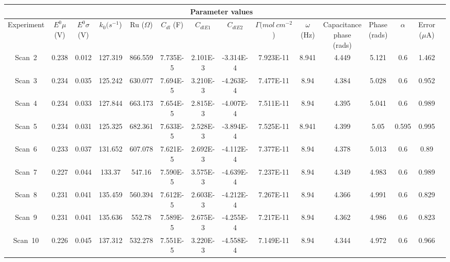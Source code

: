 \documentclass[preview]{standalone}
\begin{document}
\begin{center}
\begin{tabular}{|c|c|c|c|c|c|c|c|c|c|c|c|c|c|c|}
\hline
\multicolumn{14}{|c|}{Parameter values}\\ 
\hline
Experiment & $E^0 \mu$ (V) & $E^0 \sigma$ (V) & $k_0 (s^{-1}$) & Ru ($\Omega$) & $C_{dl}$ (F) & $C_{dlE1}$ & $C_{dlE2}$ & $\Gamma (mol\:cm^{-2}$) & $\omega$ (Hz) & Capacitance phase (rads) & Phase (rads) & $\alpha$ & Error ($\mu$A)\\
\hline
Scan\ 2 & 0.238 & 0.012 & 127.319 & 866.559 & 7.735E-5 & 2.101E-3 & -3.314E-4 & 7.923E-11 & 8.941 & 4.449 & 5.121 & 0.6 & 1.462\\
\hline
Scan\ 3 & 0.234 & 0.035 & 125.242 & 630.077 & 7.694E-5 & 3.210E-3 & -4.263E-4 & 7.477E-11 & 8.94 & 4.384 & 5.028 & 0.6 & 0.952\\
\hline
Scan\ 4 & 0.234 & 0.033 & 127.844 & 663.173 & 7.654E-5 & 2.815E-3 & -4.007E-4 & 7.511E-11 & 8.94 & 4.395 & 5.041 & 0.6 & 0.989\\
\hline
Scan\ 5 & 0.234 & 0.031 & 125.325 & 682.361 & 7.633E-5 & 2.528E-3 & -3.894E-4 & 7.525E-11 & 8.941 & 4.399 & 5.05 & 0.595 & 0.995\\
\hline
Scan\ 6 & 0.233 & 0.037 & 131.652 & 607.078 & 7.621E-5 & 2.692E-3 & -4.112E-4 & 7.377E-11 & 8.94 & 4.378 & 5.013 & 0.6 & 0.89\\
\hline
Scan\ 7 & 0.227 & 0.044 & 133.37 & 547.16 & 7.590E-5 & 3.575E-3 & -4.639E-4 & 7.237E-11 & 8.94 & 4.349 & 4.983 & 0.6 & 0.989\\
\hline
Scan\ 8 & 0.231 & 0.041 & 135.459 & 560.394 & 7.612E-5 & 2.603E-3 & -4.212E-4 & 7.267E-11 & 8.94 & 4.366 & 4.991 & 0.6 & 0.829\\
\hline
Scan\ 9 & 0.231 & 0.041 & 135.636 & 552.78 & 7.589E-5 & 2.675E-3 & -4.255E-4 & 7.217E-11 & 8.94 & 4.362 & 4.986 & 0.6 & 0.823\\
\hline
Scan\ 10 & 0.226 & 0.045 & 137.312 & 532.278 & 7.551E-5 & 3.220E-3 & -4.558E-4 & 7.149E-11 & 8.94 & 4.344 & 4.972 & 0.6 & 0.966\\
\hline
\end{tabular}
\end{center}
\end{document}
